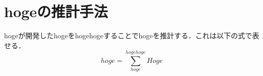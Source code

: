 \documentclass[a4paper,xelatex,ja=standard,hiresbb,12pt]{bxjsarticle}
\begin{document}
    \section{hogeの推計手法 \label{sec:手法}}
    hogeが開発したhogeをhogehogeすることでhogeを推計する．これは以下の式で表せる．
    \begin{equation}
        hoge = \sum_{hoge}^{hogehoge} Hoge
    \end{equation}
    
\end{document}

